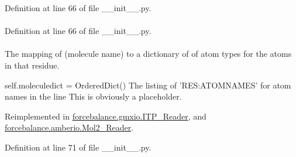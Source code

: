 \-Definition at line 66 of file \-\_\-\-\_\-init\-\_\-\-\_\-.\-py.

\hypertarget{classforcebalance_1_1BaseReader_a80c8e3bea212600742968aa8669e557b}{
\paragraph[{ln}]{}}\label{classforcebalance_1_1BaseReader_a80c8e3bea212600742968aa8669e557b}


\-Definition at line 66 of file \-\_\-\-\_\-init\-\_\-\-\_\-.\-py.

\hypertarget{classforcebalance_1_1BaseReader_ab444c213e15929253dd73395ac5f19fc}{
\paragraph[{molatom}]{}}\label{classforcebalance_1_1BaseReader_ab444c213e15929253dd73395ac5f19fc}


\-The mapping of (molecule name) to a dictionary of of atom types for the atoms in that residue. 

self.\-moleculedict = \-Ordered\-Dict() \-The listing of '\-R\-E\-S\-:\-A\-T\-O\-M\-N\-A\-M\-E\-S' for atom names in the line \-This is obviously a placeholder. 

\-Reimplemented in \hyperlink{classforcebalance_1_1gmxio_1_1ITP__Reader_a5ed800499e9442adaea0cee243960f94}{forcebalance.\-gmxio.\-I\-T\-P\-\_\-\-Reader}, and \hyperlink{classforcebalance_1_1amberio_1_1Mol2__Reader_acdeaabdae39b208fb9430ee4cd6de113}{forcebalance.\-amberio.\-Mol2\-\_\-\-Reader}.



\-Definition at line 71 of file \-\_\-\-\_\-init\-\_\-\-\_\-.\-py.


